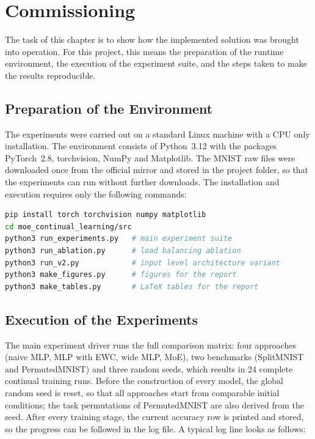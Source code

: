\chapter{Commissioning}
\label{chap:commissioning}

The task of this chapter is to show how the implemented solution was
brought into operation. For this project, this means the preparation of the
runtime environment, the execution of the experiment suite, and the steps
taken to make the results reproducible.

\section{Preparation of the Environment}
\label{sec:environment}

The experiments were carried out on a standard Linux machine with a CPU
only installation. The environment consists of Python~3.12 with the
packages PyTorch~2.8, torchvision, NumPy and Matplotlib. The MNIST raw
files were downloaded once from the official mirror and stored in the
project folder, so that the experiments can run without further downloads.
The installation and execution requires only the following commands:

\begin{lstlisting}[language=bash, caption={Installation and execution of
the experiment suite.}, label={lst:commands}]
pip install torch torchvision numpy matplotlib
cd moe_continual_learning/src
python3 run_experiments.py   # main experiment suite
python3 run_ablation.py      # load balancing ablation
python3 run_v2.py            # input level architecture variant
python3 make_figures.py      # figures for the report
python3 make_tables.py       # LaTeX tables for the report
\end{lstlisting}

\section{Execution of the Experiments}
\label{sec:execution}

The main experiment driver runs the full comparison matrix: four approaches
(naive MLP, MLP with EWC, wide MLP, MoE), two benchmarks (SplitMNIST and
PermutedMNIST) and three random seeds, which results in 24 complete
continual training runs. Before the construction of every model, the global
random seed is reset, so that all approaches start from comparable initial
conditions; the task permutations of PermutedMNIST are also derived from
the seed. After every training stage, the current accuracy row is printed
and stored, so the progress can be followed in the log file. A typical log
line looks as follows:


